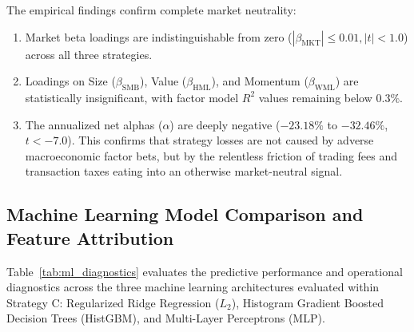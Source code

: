 \documentclass[11pt,a4paper]{article}
\begin{document}
\begin{table}[htbp]
\centering
\caption{Asset Pricing Factor Regressions: IIMA Four-Factor Loadings and Institutional Alphas}
\label{tab:factor_regressions}
\end{table}

The empirical findings confirm complete market neutrality:
\begin{enumerate}
    \item Market beta loadings are indistinguishable from zero ($|\beta_{\text{MKT}}| \le 0.01, |t| < 1.0$) across all three strategies.
    \item Loadings on Size ($\beta_{\text{SMB}}$), Value ($\beta_{\text{HML}}$), and Momentum ($\beta_{\text{WML}}$) are statistically insignificant, with factor model $R^2$ values remaining below $0.3\%$.
    \item The annualized net alphas ($\alpha$) are deeply negative ($-23.18\%$ to $-32.46\%$, $t < -7.0$). This confirms that strategy losses are not caused by adverse macroeconomic factor bets, but by the relentless friction of trading fees and transaction taxes eating into an otherwise market-neutral signal.
\end{enumerate}

\subsection{Machine Learning Model Comparison and Feature Attribution}
Table~\ref{tab:ml_diagnostics} evaluates the predictive performance and operational diagnostics across the three machine learning architectures evaluated within Strategy C: Regularized Ridge Regression ($L_2$), Histogram Gradient Boosted Decision Trees (HistGBM), and Multi-Layer Perceptrons (MLP).
\end{document}
